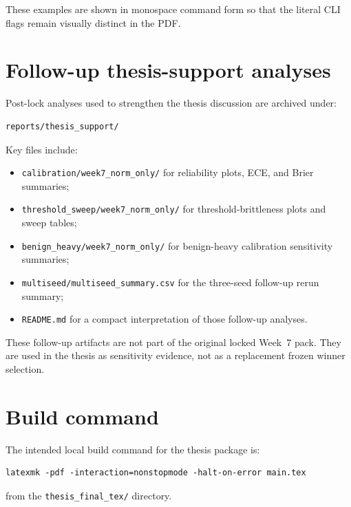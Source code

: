 These examples are shown in monospace command form so that the literal CLI flags remain visually distinct in the PDF.

\section{Follow-up thesis-support analyses}

Post-lock analyses used to strengthen the thesis discussion are archived under:
\begin{verbatim}
reports/thesis_support/
\end{verbatim}

Key files include:
\begin{itemize}
  \item \texttt{calibration/week7\_norm\_only/} for reliability plots, ECE, and Brier summaries;
  \item \texttt{threshold\_sweep/week7\_norm\_only/} for threshold-brittleness plots and sweep tables;
  \item \texttt{benign\_heavy/week7\_norm\_only/} for benign-heavy calibration sensitivity summaries;
  \item \texttt{multiseed/multiseed\_summary.csv} for the three-seed follow-up rerun summary;
  \item \texttt{README.md} for a compact interpretation of those follow-up analyses.
\end{itemize}

These follow-up artifacts are not part of the original locked Week~7 pack. They are used in the thesis as sensitivity evidence, not as a replacement frozen winner selection.

\section{Build command}

The intended local build command for the thesis package is:
\begin{verbatim}
latexmk -pdf -interaction=nonstopmode -halt-on-error main.tex
\end{verbatim}
from the \texttt{thesis\_final\_tex/} directory.
